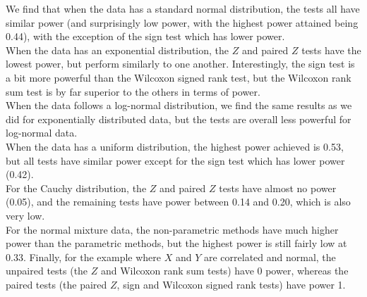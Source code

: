 \documentclass[11pt]{article}
\begin{document}
\noindent We find that when the data has a standard normal distribution, the tests all have similar power (and surprisingly low power, with the highest power attained being 0.44), with the exception of the sign test which has lower power.\\
 When the data has an exponential distribution, the $Z$ and paired $Z$ tests have the lowest power, but perform similarly to one another. Interestingly, the sign test is a bit more powerful than the Wilcoxon signed rank test, but the Wilcoxon rank sum test is by far superior to the others in terms of power. \\
 When the data follows a log-normal distribution, we find the same results as we did for exponentially distributed data, but the tests are overall less powerful for log-normal data.\\
  When the data has a uniform distribution, the highest power achieved is 0.53, but all tests have similar power except for the sign test which has lower power (0.42).\\ 
  For the Cauchy distribution, the $Z$ and paired $Z$ tests have almost no power (0.05), and the remaining tests have power between 0.14 and 0.20, which is also very low. \\
  For the normal mixture data, the non-parametric methods have much higher power than the parametric methods, but the highest power is still fairly low at 0.33. Finally, for the example where $X$ and $Y$ are correlated and normal, the unpaired tests (the $Z$ and Wilcoxon rank sum tests) have 0 power, whereas the paired tests (the paired $Z$, sign and Wilcoxon signed rank tests) have power 1.
\end{document}
